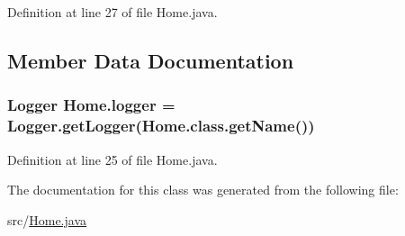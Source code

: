 Definition at line 27 of file Home.\-java.



\subsection{Member Data Documentation}
\hypertarget{class_home_ac74d97ae59ddf53153a62e8790619756}{
\subsubsection[{logger}]{\setlength{\rightskip}{0pt plus 5cm}Logger {\bf Home.\-logger} = Logger.\-get\-Logger(Home.\-class.\-get\-Name())}}\label{class_home_ac74d97ae59ddf53153a62e8790619756}


Definition at line 25 of file Home.\-java.



The documentation for this class was generated from the following file\-:\begin{DoxyCompactItemize}
\item 
src/\hyperlink{_home_8java}{Home.\-java}\end{DoxyCompactItemize}
